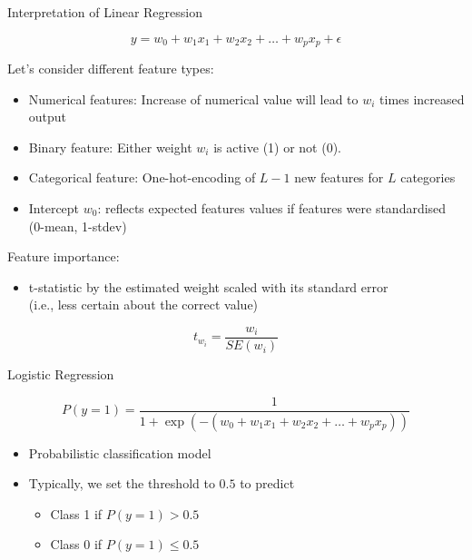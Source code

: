 \documentclass[aspectratio=169]{../latex_main/tntbeamer}  %
\begin{document}
\begin{frame}[c]{Interpretation of Linear Regression}

    $$y = w_0 + w_1 x_1 + w_2 x_2 + \ldots + w_p x_p + \epsilon $$

    Let's consider different feature types:
    \begin{itemize}
        \item Numerical features: Increase of numerical value will lead to $w_i$ times increased output
        \item Binary feature: Either weight $w_i$ is active (1) or not (0).
        \item Categorical feature: One-hot-encoding of $L-1$ new features for $L$ categories
        \item Intercept $w_0$: reflects expected features values if features were standardised (0-mean, 1-stdev)
    \end{itemize}	
    \pause
    Feature importance:
    \begin{itemize}
        \item t-statistic by the estimated weight scaled with its standard error\\ (i.e., less certain about the correct value)
    \end{itemize}
    $$t_{w_i} = \frac{w_i}{SE(w_i)} $$
\end{frame}

	
\begin{frame}{Logistic Regression}

    $$P(y = 1) =\frac{1}{1 + \exp(-( w_0 + w_1 x_1 + w_2 x_2 + \ldots + w_p x_p ))} $$

    \begin{itemize}
        \item Probabilistic \alert{classification} model 
        \item Typically, we set the threshold to $0.5$ to predict 
        \begin{itemize}
            \item Class 1 if $P(y=1) > 0.5$
            \item Class 0 if $P(y=1) \leq 0.5$
        \end{itemize}
    \end{itemize}	

\end{frame}
\end{document}
